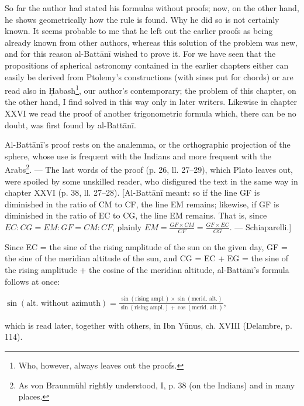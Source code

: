 \documentclass[11pt]{article}
\begin{document}
\par So far the author had stated his formulas without proofs; now, on the other hand, he shows geometrically how the rule is found. Why he did so is not certainly known. It seems probable to me that he left out the earlier proofs as being already known from other authors, whereas this solution of the problem was new, and for this reason al-Battānī wished to prove it. For we have seen that the propositions of spherical astronomy contained in the earlier chapters either can easily be derived from Ptolemy's constructions (with sines put for chords) or are read also in Ḥabash\footnote{Who, however, always leaves out the proofs.}, our author's contemporary; the problem of this chapter, on the other hand, I find solved in this way only in later writers. Likewise in chapter XXVI we read the proof of another trigonometric formula which, there can be no doubt, was first found by al-Battānī.\par
\par Al-Battānī's proof rests on the analemma, or the orthographic projection of the sphere, whose use is frequent with the Indians and more frequent with the Arabs\footnote{As von Braunmühl rightly understood, I, p. 38 (on the Indians) and in many places.}. — The last words of the proof (p. 26, ll. 27–29), which Plato leaves out, were spoiled by some unskilled reader, who disfigured the text in the same way in chapter XXVI (p. 38, ll. 27–28). [Al-Battānī meant: so if the line GF is diminished in the ratio of CM to CF, the line EM remains; likewise, if GF is diminished in the ratio of EC to CG, the line EM remains. That is, since $EC : CG = EM : GF = CM : CF$, plainly $EM = \frac{GF \times CM}{CF} = \frac{GF \times EC}{CG}$. — Schiaparelli.]\par
\par Since EC = the sine of the rising amplitude of the sun on the given day, GF = the sine of the meridian altitude of the sun, and CG = EC + EG = the sine of the rising amplitude + the cosine of the meridian altitude, al-Battānī's formula follows at once: \par\noindent\hspace*{1.5em}$\displaystyle \sin(\text{alt. without azimuth}) = \frac{\sin(\text{rising ampl.}) \times \sin(\text{merid. alt.})}{\sin(\text{rising ampl.}) + \cos(\text{merid. alt.})},$\par which is read later, together with others, in Ibn Yūnus, ch. XVIII (Delambre, p. 114).\par
\end{document}
